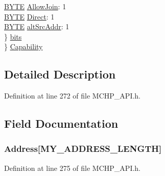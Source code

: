 \begin{DoxyCompactItemize}
\begin{tabbing}
\>\>\hyperlink{_generic_type_defs_8h_a4ae1dab0fb4b072a66584546209e7d58}{BYTE} \hyperlink{struct_a_c_t_i_v_e___s_c_a_n___r_e_s_u_l_t_a2c62415ed8e94a03083433a357b16b94}{AllowJoin}: 1\\
\>\>\hyperlink{_generic_type_defs_8h_a4ae1dab0fb4b072a66584546209e7d58}{BYTE} \hyperlink{struct_a_c_t_i_v_e___s_c_a_n___r_e_s_u_l_t_ad33dd5039670fedef4a6afb388e4e550}{Direct}: 1\\
\>\>\hyperlink{_generic_type_defs_8h_a4ae1dab0fb4b072a66584546209e7d58}{BYTE} \hyperlink{struct_a_c_t_i_v_e___s_c_a_n___r_e_s_u_l_t_a2891a27f6de91b6476896d30d0efea34}{altSrcAddr}: 1\\
\>\} \hyperlink{struct_a_c_t_i_v_e___s_c_a_n___r_e_s_u_l_t_a08c27adccd6d8db06ba2720608af9d5e}{bits}\\
\} \hyperlink{struct_a_c_t_i_v_e___s_c_a_n___r_e_s_u_l_t_a6d7992e3363f7597c8af1c9a464c60c6}{Capability}\\

\end{tabbing}\end{DoxyCompactItemize}


\subsection{Detailed Description}


Definition at line 272 of file M\+C\+H\+P\+\_\+\+A\+P\+I.\+h.



\subsection{Field Documentation}
\hypertarget{struct_a_c_t_i_v_e___s_c_a_n___r_e_s_u_l_t_ac1d21f82df5bb86803475c1ee98f9dc5}{}
\subsubsection[{Address}]{ Address\mbox{[}M\+Y\+\_\+\+A\+D\+D\+R\+E\+S\+S\+\_\+\+L\+E\+N\+G\+T\+H\mbox{]}}\label{struct_a_c_t_i_v_e___s_c_a_n___r_e_s_u_l_t_ac1d21f82df5bb86803475c1ee98f9dc5}


Definition at line 275 of file M\+C\+H\+P\+\_\+\+A\+P\+I.\+h.

